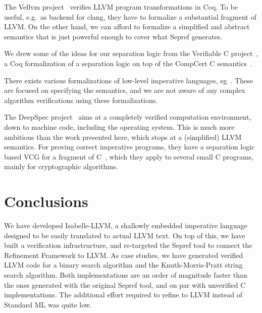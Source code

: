 \documentclass[a4paper,USenglish,cleveref, autoref]{lipics-v2019}
\begin{document}
The Vellvm project~\cite{ZNMZ12,ZNMZ13} verifies LLVM program transformations in Coq.
To be useful, e.g.~as backend for clang, they have to formalize a substantial fragment of LLVM. 
On the other hand, we can afford to formalize a simplified and abstract semantics that 
is just powerful enough to cover what Sepref generates.

We drew some of the ideas for our separation logic from the Verifiable C project~\cite{App14}, 
a Coq formalization of a separation logic on top of the CompCert C semantics~\cite{BL09}.

There exists various formalizations of low-level imperative languages, eg~\cite{Loch12,Watt18}. 
These are focused on specifying the semantics, and we are not aware of any complex 
algorithm verifications using these formalizations.

The DeepSpec project~\cite{deepspec} aims at a completely verified computation environment, 
down to machine code, including the operating system. 
This is much more ambitious than the work presented here, which stops at a (simplified) LLVM semantics.
For proving correct imperative programs, they have a separation logic based VCG for a fragment of C~\cite{App14,CBGD18},
which they apply to several small C programs, mainly for cryptographic algorithms. 


\section{Conclusions}
We have developed Isabelle-LLVM, a shallowly embedded imperative language designed to be easily translated to actual LLVM text. 
On top of this, we have built a verification 
infrastructure, and re-targeted the Sepref tool to connect the Refinement Framework to LLVM. 
As case studies, we have generated verified LLVM code for a binary search algorithm and the Knuth-Morris-Pratt string search algorithm.
Both implementations are an order of magnitude faster than the ones generated with the original Sepref tool, and on par with unverified C implementations.
The additional effort required to refine to LLVM instead of Standard ML was quite low.






% 
\end{document}
